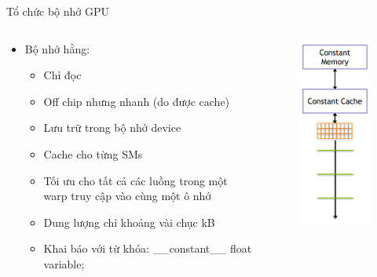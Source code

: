 \documentclass[10pt]{beamer}
\theoremstyle{remark}
\numberwithin{algocf}{section}
\numberwithin{equation}{section}
\numberwithin{dl}{section}
\numberwithin{figure}{section}
\begin{document}
\begin{frame}{Tổ chức bộ nhớ GPU}
    \begin{columns}[onlytextwidth]
        \begin{column}{0.5\linewidth}
            \begin{itemize}
                \item Bộ nhớ hằng:
                \begin{itemize}
                    \item Chỉ đọc
                    \item Off chip nhưng nhanh (do được cache)
                    \item Lưu trữ trong bộ nhớ device
                    \item Cache cho từng SMs 
                    \item Tối ưu cho tất cả các luồng trong một warp truy cập vào cùng một ô nhớ
                    \item Dung lượng chỉ khoảng vài chục kB 
                    \item Khai báo với từ khóa: \_\_constant\_\_ float variable;
                \end{itemize}
            \end{itemize}
        \end{column}
        \begin{column}{0.5\linewidth}
            \begin{figure}[H]
                \centering
                \includegraphics[height=0.9\textheight]{figures/CUDA/GPU_Constant_Memory.png}
            \end{figure}
        \end{column}
    \end{columns}
\end{frame}
\end{document}
